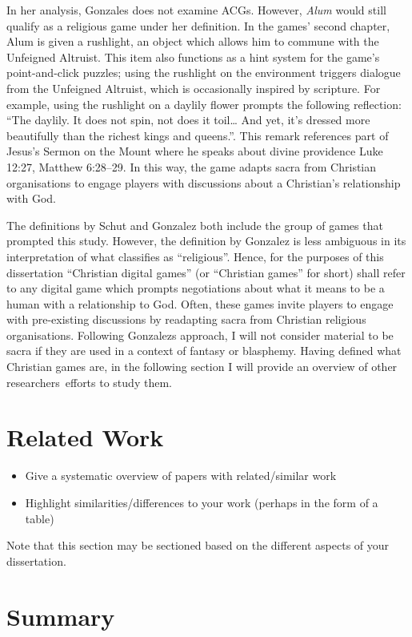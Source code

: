 
In her analysis, Gonzales does not examine \acp{ACG}. However, \textit{Alum} would still qualify as a religious game under her definition. In the games' second chapter, Alum is given a rushlight, an object which allows him to commune with the Unfeigned Altruist. This item also functions as a hint system for the game's point-and-click puzzles; using the rushlight on the environment triggers dialogue from the Unfeigned Altruist, which is occasionally inspired by scripture. For example, using the rushlight on a daylily flower prompts the following reflection: ``The daylily. It does not spin, not does it toil… And yet, it’s dressed more beautifully than the richest kings and queens.''. This remark references part of Jesus's Sermon on the Mount where he speaks about divine providence Luke 12:27, Matthew 6:28–29. In this way, the game adapts sacra from Christian organisations to engage players with discussions about a Christian's relationship with God.


The definitions by Schut and Gonzalez both include the group of games that prompted this study. However, the definition by Gonzalez is less ambiguous in its interpretation of what classifies as ``religious''. Hence, for the purposes of this dissertation ``Christian digital games'' (or ``Christian games'' for short) shall refer to any digital game which prompts negotiations about what it means to be a human with a relationship to God. Often, these games invite players to engage with pre-existing discussions by readapting sacra from Christian religious organisations.  Following Gonzalez\textquotesingle s approach, I will not consider material to be sacra if they are used in a context of fantasy or blasphemy. Having defined what Christian games are, in the following section I will provide an overview of other researchers\textquotesingle \  efforts to study them.
\section{Related Work}

  \begin{itemize}
   \item Give a systematic overview of papers with related/similar work
   \item Highlight similarities/differences to your work (perhaps in the form of a table)
  \end{itemize}

  Note that this section may be sectioned based on the different aspects of your dissertation.
\fi

\section{Summary}
\blindtext

